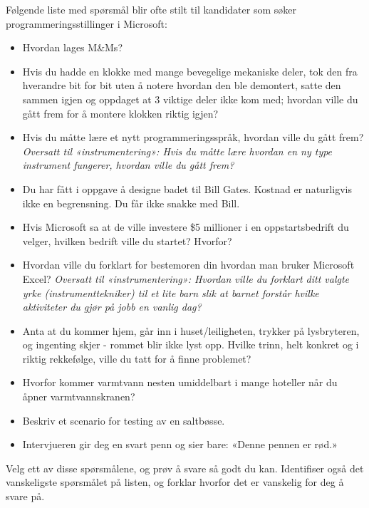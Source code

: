 

Følgende liste med spørsmål blir ofte stilt til kandidater som søker programmeringsstillinger i Microsoft:

\begin{itemize}
\item{} Hvordan lages M\&Ms?
\vskip 5pt
\item{} Hvis du hadde en klokke med mange bevegelige mekaniske deler, tok den fra hverandre bit for bit uten å notere hvordan den ble demontert, satte den sammen igjen og oppdaget at 3 viktige deler ikke kom med; hvordan ville du gått frem for å montere klokken riktig igjen?
\vskip 5pt
\item{} Hvis du måtte lære et nytt programmeringsspråk, hvordan ville du gått frem? {\it Oversatt til «instrumentering»: Hvis du måtte lære hvordan en ny type instrument fungerer, hvordan ville du gått frem?}
\vskip 5pt
\item{} Du har fått i oppgave å designe badet til Bill Gates. Kostnad er naturligvis ikke en begrensning. Du får ikke snakke med Bill.
\vskip 5pt
\item{} Hvis Microsoft sa at de ville investere \$5 millioner i en oppstartsbedrift du velger, hvilken bedrift ville du startet? Hvorfor?
\vskip 5pt
\item{} Hvordan ville du forklart for bestemoren din hvordan man bruker Microsoft Excel? {\it Oversatt til «instrumentering»: Hvordan ville du forklart ditt valgte yrke (instrumenttekniker) til et lite barn slik at barnet forstår hvilke aktiviteter du gjør på jobb en vanlig dag?}
\vskip 5pt
\item{} Anta at du kommer hjem, går inn i huset/leiligheten, trykker på lysbryteren, og ingenting skjer - rommet blir ikke lyst opp. Hvilke trinn, helt konkret og i riktig rekkefølge, ville du tatt for å finne problemet?
\vskip 5pt
\item{} Hvorfor kommer varmtvann nesten umiddelbart i mange hoteller når du åpner varmtvannskranen?
\vskip 5pt
\item{} Beskriv et scenario for testing av en saltbøsse.
\vskip 5pt
\item{} Intervjueren gir deg en svart penn og sier bare: «Denne pennen er rød.»
\end{itemize}

Velg ett av disse spørsmålene, og prøv å svare så godt du kan. Identifiser også det vanskeligste spørsmålet på listen, og forklar hvorfor det er vanskelig for deg å svare på.

